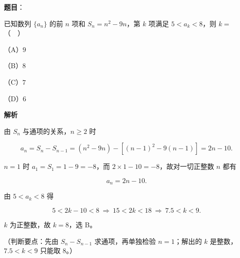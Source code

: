 \begin{answer}

\textbf{题目}：

已知数列 $\{a_n\}$ 的前 $n$ 项和 $S_n=n^2-9n$，第 $k$ 项满足 $5<a_k<8$，则 $k=$（　）

（A）$9$

（B）$8$

（C）$7$

（D）$6$

\textbf{解析}

由 $S_n$ 与通项的关系，$n\geqslant2$ 时

\nopagebreak[4]
\[a_n=S_n-S_{n-1}=(n^2-9n)-[(n-1)^2-9(n-1)]=2n-10.\]

$n=1$ 时 $a_1=S_1=1-9=-8$，而 $2\times1-10=-8$，故对一切正整数 $n$ 都有

\nopagebreak[4]
\[a_n=2n-10.\]

由 $5<a_k<8$ 得

\nopagebreak[4]
\[5<2k-10<8\ \Rightarrow\ 15<2k<18\ \Rightarrow\ 7.5<k<9.\]

$k$ 为正整数，故 $k=8$，选 B。

（判断要点：先由 $S_n-S_{n-1}$ 求通项，再单独检验 $n=1$；解出的 $k$ 是整数，$7.5<k<9$ 只能取 $8$。）


\end{answer}
